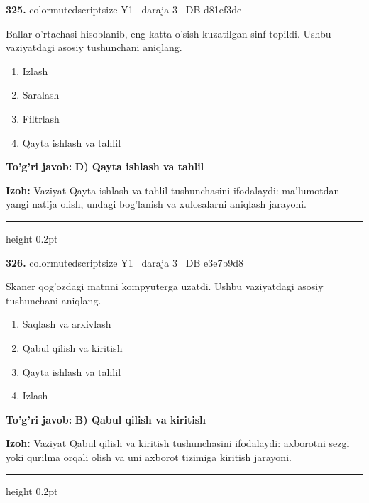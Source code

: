 \documentclass[10pt,a4paper,oneside]{article}
\begin{document}
\noindent\textbf{\color{ink}325.}  {color{muted}scriptsize Y1 \textbullet\ daraja 3 \textbullet\ DB d81ef3de}
\par
Ballar o'rtachasi hisoblanib, eng katta o'sish kuzatilgan sinf topildi. Ushbu vaziyatdagi asosiy tushunchani aniqlang.
\begin{enumerate}[label=\Alph*),leftmargin=9mm]
\item Izlash
\item Saralash
\item Filtrlash
\item Qayta ishlash va tahlil
\end{enumerate}
\begin{tcolorbox}[enhanced,breakable,colback=teal!4,colframe=teal!50!black,boxrule=0.5pt,arc=1.1mm,left=3mm,right=3mm,top=1.7mm,bottom=1.7mm,before skip=2mm,after skip=2mm]
\textbf{\color{teal}To'g'ri javob:} \textbf{D) Qayta ishlash va tahlil}
\par\smallskip
\textbf{Izoh:} Vaziyat Qayta ishlash va tahlil tushunchasini ifodalaydi: ma'lumotdan yangi natija olish, undagi bog'lanish va xulosalarni aniqlash jarayoni.
\end{tcolorbox}
\vspace{2mm}\hrule height 0.2pt \vspace{3mm}

\noindent\textbf{\color{ink}326.}  {color{muted}scriptsize Y1 \textbullet\ daraja 3 \textbullet\ DB e3e7b9d8}
\par
Skaner qog'ozdagi matnni kompyuterga uzatdi. Ushbu vaziyatdagi asosiy tushunchani aniqlang.
\begin{enumerate}[label=\Alph*),leftmargin=9mm]
\item Saqlash va arxivlash
\item Qabul qilish va kiritish
\item Qayta ishlash va tahlil
\item Izlash
\end{enumerate}
\begin{tcolorbox}[enhanced,breakable,colback=teal!4,colframe=teal!50!black,boxrule=0.5pt,arc=1.1mm,left=3mm,right=3mm,top=1.7mm,bottom=1.7mm,before skip=2mm,after skip=2mm]
\textbf{\color{teal}To'g'ri javob:} \textbf{B) Qabul qilish va kiritish}
\par\smallskip
\textbf{Izoh:} Vaziyat Qabul qilish va kiritish tushunchasini ifodalaydi: axborotni sezgi yoki qurilma orqali olish va uni axborot tizimiga kiritish jarayoni.
\end{tcolorbox}
\vspace{2mm}\hrule height 0.2pt \vspace{3mm}
\end{document}
